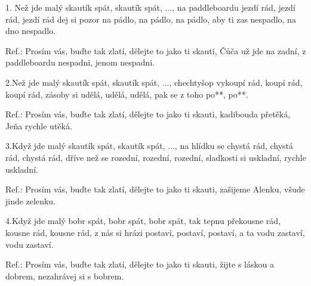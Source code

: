 
1. Než jde malý skautík spát, skautík spát, ...,
na paddleboardu jezdí rád, jezdí rád, jezdí rád
dej si pozor na pádlo, na pádlo, na pádlo,
aby ti zas nespadlo, na dno nespadlo.

Ref.: Prosím vás, buďte tak zlatí,
dělejte to jako ti skauti,
Čůča už jde na zadní,
z paddleboardu nespadni, jenom nespadni.

2.Než jde malý skautík spát, skautík spát, ...,
chechtyšop vykoupí rád, koupí rád, koupí rád,
zásoby si udělá, udělá, udělá,
pak se z toho po**, po**.

Ref.: Prosím vás, buďte tak zlatí,
dělejte to jako ti skauti,
kadibouda přetěká,
Jeňa rychle utěká.

3.Když jde malý skautík spát, skautík spát, ...,
na hlídku se chystá rád, chystá rád, chystá rád,
dříve než se rozední, rozední, rozední,
sladkosti si uskladní, rychle uskladní.

Ref.: Prosím vás, buďte tak zlatí,
dělejte to jako ti skauti,
zašijeme Alenku,
všude jinde zelenku.

4.Když jde malý bobr spát, bobr spát, bobr spát,
tak tepnu překousne rád, kousne rád, kousne rád,
z nás si hrázi postaví, postaví, postaví,
a ta vodu zastaví, vodu zastaví.

Ref.: Prosím vás, buďte tak zlatí,
dělejte to jako ti skauti,
žijte s láskou a dobrem,
nezahrávej si s bobrem.


